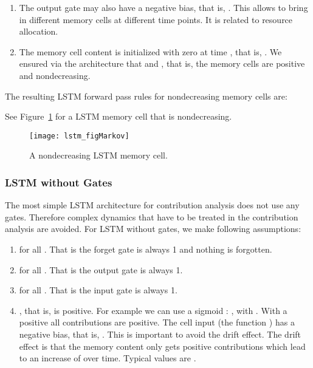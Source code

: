 \documentclass{article}
\begin{document}
\begin{appendices}
\begin{enumerate}[label=\textbf{(A\arabic*)}]
\item The output gate  may also have a negative bias, that is,
  . This allows to bring in different memory cells at
  different time points. It is related to resource allocation.
  
\item The memory cell content is initialized with zero at time ,
  that is, . We ensured via the architecture that 
  and , that is, 
  the memory cells are positive and nondecreasing.
 
\end{enumerate}

The resulting LSTM forward pass rules for nondecreasing memory cells are:

See Figure~\ref{fig:cellLRPMarkov} for a LSTM memory cell that is
nondecreasing.

\begin{figure}[htb]
\centering
\texttt{[image: lstm\_figMarkov]}
\caption{A nondecreasing LSTM memory cell. 
\label{fig:cellLRPMarkov}}
\end{figure}

\subsubsection{LSTM without Gates}

The most simple LSTM architecture for contribution analysis does not
use any gates. Therefore complex dynamics that have to be treated 
in the contribution analysis are avoided.
For LSTM without gates, 
we make following assumptions:
\begin{enumerate}[label=\textbf{(A\arabic*)}]
\item  for all . That is the forget gate is always 1 and
  nothing is forgotten. 

\item  for all . That is the output gate is always 1.

\item  for all . That is the input gate is always 1.

\item , that is,  is positive. For example we can use a sigmoid
  : , with
  .
  With a positive  all
  contributions are positive.
  The cell input  (the function ) has a negative bias, that is,
  . This is important to avoid the drift effect.
  The drift effect is that the memory content only gets positive
  contributions which lead to an increase of  over time.
  Typical values are .


\end{enumerate}
\end{appendices}
\end{document}
